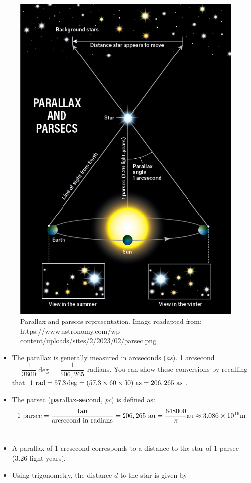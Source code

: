 \documentclass[
  letterpaper,
  DIV=11,
  numbers=noendperiod]{scrreprt}
\begin{document}
\begin{figure}

{\centering \includegraphics{img/parallax_parsecs.png}

}

\caption{Parallax and parsecs representation. Image readapted from:
https://www.astronomy.com/wp-content/uploads/sites/2/2023/02/parsec.png}

\end{figure}

\begin{itemize}
\item
  The parallax is generally measured in arcseconds (\emph{as}). 1
  arcsecond \(= \dfrac{1}{3600} \deg = \dfrac{1}{206,265}\) radians. You
  can show these conversions by recalling that
  \(1\ \rm{rad} = 57.3\deg = (57.3\times 60\times 60)\ \rm{as}=206,265\ \rm{as}\).
\item
  The parsec (\textbf{par}allax-\textbf{sec}ond, \emph{pc}) is defined
  as:
  \[ 1\ \rm{parsec} = \dfrac{1 au}{\rm{arcsecond\  in\  radians}} = 206,265\ au= \dfrac{648000}{\pi} \rm{au} \approx 3.086\times 10^{16}\rm{m}\].
\item
  A parallax of 1 arcsecond corresponds to a distance to the star of 1
  parsec (3.26 light-years).
\item
  Using trigonometry, the distance \(d\) to the star is given by:
\end{itemize}
\end{document}
